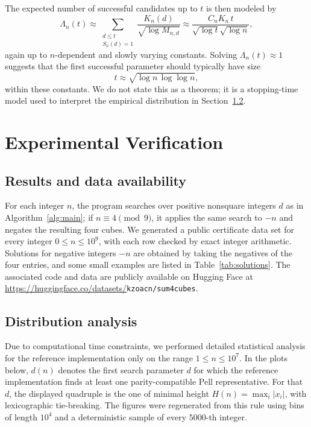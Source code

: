 \documentclass{mcom-l}
\theoremstyle{definition}
\theoremstyle{remark}
\numberwithin{equation}{section}
\begin{document}
The expected number of successful candidates up to $t$ is then modeled by
\[
        \Lambda_n(t)
        \approx
        \sum_{\substack{d\leq t\\ S_n(d)=1}}
        \frac{K_n(d)}{\sqrt{\log M_{n,d}}}
        \approx
        \frac{C_nK_n\,t}{\sqrt{\log t}\sqrt{\log n}},
\]
again up to $n$-dependent and slowly varying constants.  Solving
$\Lambda_n(t)\approx1$ suggests that the first successful parameter should
typically have size
\[
        t \approx \sqrt{\log n\,\log\log n},
\]
within these constants.  We do not state this as a theorem; it is a
stopping-time model used to interpret the empirical distribution in
Section~\ref{subsec:distribution}.

\section{Experimental Verification}
\label{sec:experimental}

\subsection{Results and data availability}
\label{subsec:results}
\label{subsec:verification_protocol}

For each integer $n$, the program searches over positive nonsquare integers
$d$ as in Algorithm~\ref{alg:main}; if $n\equiv 4\pmod 9$, it applies the
same search to $-n$ and negates the resulting four cubes.  We generated a
public certificate data set for every integer $0\leq n\leq 10^9$, with each
row checked by exact integer arithmetic.  Solutions for negative integers
$-n$ are obtained by taking the negatives of the four entries, and some small
examples are listed in Table~\ref{tab:solutions}.
The associated code and data are publicly available on Hugging Face at
\url{https://huggingface.co/datasets/}\texttt{kzoacn/sum4cubes}.

\subsection{Distribution analysis}
\label{subsec:distribution}

Due to computational time constraints, we performed detailed statistical
analysis for the reference implementation only on the range
$1 \leq n \leq 10^7$.  In the plots below, $d(n)$ denotes the first search
parameter $d$ for which the reference implementation finds at least one
parity-compatible Pell representative.  For that $d$, the displayed
quadruple is the one of minimal height $H(n)=\max_i |x_i|$, with
lexicographic tie-breaking.  The figures were regenerated from this rule
using bins of length $10^4$ and a deterministic sample of every $5000$-th
integer.
\end{document}
